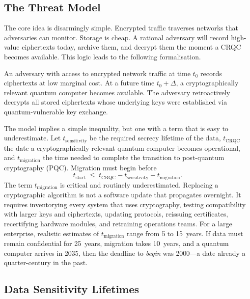 \subsection{The Threat Model}

The core idea is disarmingly simple.  Encrypted traffic traverses networks that adversaries can monitor.  Storage is cheap.  A rational adversary will record high-value ciphertexts today, archive them, and decrypt them the moment a CRQC becomes available.  This logic leads to the following formalisation.

\begin{definition}
\label{def:hndl}
An adversary with access to encrypted network traffic at time $t_0$ records ciphertexts at low marginal cost.  At a future time $t_0 + \Delta$, a cryptographically relevant quantum computer becomes available.  The adversary retroactively decrypts all stored ciphertexts whose underlying keys were established via quantum-vulnerable key exchange.
\end{definition}

The model implies a simple inequality, but one with a term that is easy to underestimate.  Let $t_{\mathrm{sensitivity}}$ be the required secrecy lifetime of the data, $t_{\mathrm{CRQC}}$ the date a cryptographically relevant quantum computer becomes operational, and $t_{\mathrm{migration}}$ the time needed to complete the transition to post-quantum cryptography (PQC).  Migration must begin before
\begin{equation}
\label{eq:hndl-deadline}
t_{\mathrm{start}} \;\leq\; t_{\mathrm{CRQC}} - t_{\mathrm{sensitivity}} - t_{\mathrm{migration}}.
\end{equation}
The term $t_{\mathrm{migration}}$ is critical and routinely underestimated.  Replacing a cryptographic algorithm is not a software update that propagates overnight.  It requires inventorying every system that uses cryptography, testing compatibility with larger keys and ciphertexts, updating protocols, reissuing certificates, recertifying hardware modules, and retraining operations teams.  For a large enterprise, realistic estimates of $t_{\mathrm{migration}}$ range from 5 to 15~years.  If data must remain confidential for 25~years, migration takes 10~years, and a quantum computer arrives in 2035, then the deadline to \emph{begin} was 2000---a date already a quarter-century in the past.

\subsection{Data Sensitivity Lifetimes}

